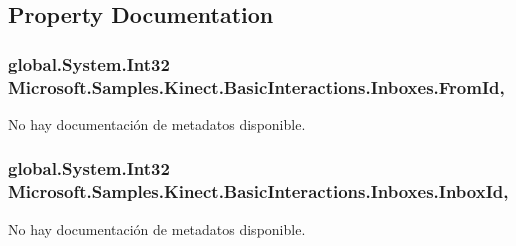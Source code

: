 \subsection{Property Documentation}
\hypertarget{class_microsoft_1_1_samples_1_1_kinect_1_1_basic_interactions_1_1_inboxes_a10e9fbc7bc14979fa5b8047ec9eec1c5}{
\subsubsection[{From\-Id}]{\setlength{\rightskip}{0pt plus 5cm}global.\-System.\-Int32 Microsoft.\-Samples.\-Kinect.\-Basic\-Interactions.\-Inboxes.\-From\-Id\hspace{0.3cm}{\ttfamily [get]}, {\ttfamily [set]}}}\label{class_microsoft_1_1_samples_1_1_kinect_1_1_basic_interactions_1_1_inboxes_a10e9fbc7bc14979fa5b8047ec9eec1c5}


No hay documentación de metadatos disponible. 

\hypertarget{class_microsoft_1_1_samples_1_1_kinect_1_1_basic_interactions_1_1_inboxes_a3906c9d8cdf9e77b228a265dc3412af3}{
\subsubsection[{Inbox\-Id}]{\setlength{\rightskip}{0pt plus 5cm}global.\-System.\-Int32 Microsoft.\-Samples.\-Kinect.\-Basic\-Interactions.\-Inboxes.\-Inbox\-Id\hspace{0.3cm}{\ttfamily [get]}, {\ttfamily [set]}}}\label{class_microsoft_1_1_samples_1_1_kinect_1_1_basic_interactions_1_1_inboxes_a3906c9d8cdf9e77b228a265dc3412af3}


No hay documentación de metadatos disponible. 


